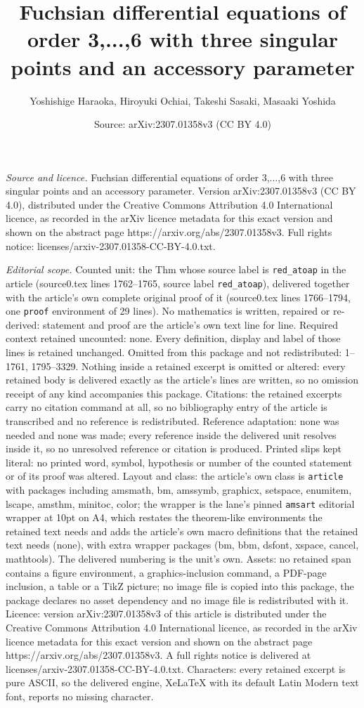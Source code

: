 \documentclass[10pt,a4paper]{amsart}
\title[Fuchsian differential equations of order 3,...,6 with three ]{Fuchsian differential equations of order 3,...,6 with three singular points and an accessory parameter}
\author{Yoshishige Haraoka, Hiroyuki Ochiai, Takeshi Sasaki, Masaaki Yoshida}
\date{Source: arXiv:2307.01358v3 (CC BY 4.0)}
\begin{document}
\maketitle

\noindent\emph{Source and licence.} Fuchsian differential equations of order 3,...,6 with three singular points and an accessory parameter. Version arXiv:2307.01358v3 (CC BY 4.0), distributed under the Creative Commons Attribution 4.0 International licence, as recorded in the arXiv licence metadata for this exact version and shown on the abstract page https://arxiv.org/abs/2307.01358v3. Full rights notice: licenses/arxiv-2307.01358-CC-BY-4.0.txt.\par\smallskip

\noindent\textit{Editorial scope.} Counted unit: the Thm whose source label is \texttt{red\_atoap} in the article (source0.tex lines 1762--1765, source label \texttt{red\_atoap}), delivered together with the article's own complete original proof of it (source0.tex lines 1766--1794, one \texttt{proof} environment of 29 lines). No mathematics is written, repaired or re-derived: statement and proof are the article's own text line for line. Required context retained uncounted: none. Every definition, display and label of those lines is retained unchanged. Omitted from this package and not redistributed: 1--1761, 1795--3329. Nothing inside a retained excerpt is omitted or altered: every retained body is delivered exactly as the article's lines are written, so no omission receipt of any kind accompanies this package. Citations: the retained excerpts carry no citation command at all, so no bibliography entry of the article is transcribed and no reference is redistributed. Reference adaptation: none was needed and none was made; every reference inside the delivered unit resolves inside it, so no unresolved reference or citation is produced. Printed slips kept literal: no printed word, symbol, hypothesis or number of the counted statement or of its proof was altered. Layout and class: the article's own class is \texttt{article} with packages including amsmath, bm, amssymb, graphicx, setspace, enumitem, lscape, amsthm, minitoc, color; the wrapper is the lane's pinned \texttt{amsart} editorial wrapper at 10pt on A4, which restates the theorem-like environments the retained text needs and adds the article's own macro definitions that the retained text needs (none), with extra wrapper packages (bm, bbm, dsfont, xspace, cancel, mathtools). The delivered numbering is the unit's own. Assets: no retained span contains a figure environment, a graphics-inclusion command, a PDF-page inclusion, a table or a TikZ picture; no image file is copied into this package, the package declares no asset dependency and no image file is redistributed with it. Licence: version arXiv:2307.01358v3 of this article is distributed under the Creative Commons Attribution 4.0 International licence, as recorded in the arXiv licence metadata for this exact version and shown on the abstract page https://arxiv.org/abs/2307.01358v3. A full rights notice is delivered at licenses/arxiv-2307.01358-CC-BY-4.0.txt. Characters: every retained excerpt is pure ASCII, so the delivered engine, XeLaTeX with its default Latin Modern text font, reports no missing character.
\end{document}
